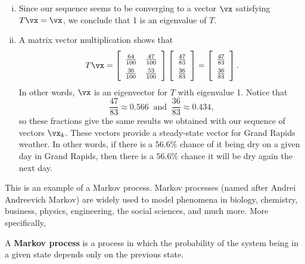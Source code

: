 \begin{example}
\begin{enumerate}[i.]
	\item Since our sequence seems to be converging to a vector $\vx$ satisfying $T \vx = \vx$, we conclude that 1 is an eigenvalue of $T$. 
	
	\item  A matrix vector multiplication shows that 
	\[T \vx = \left[ \renewcommand{\arraystretch}{1.4} \begin{array}{cc} \frac{64}{100}&\frac{47}{100} \\ \frac{36}{100}&\frac{53}{100} \end{array} \right]\left[ \renewcommand{\arraystretch}{1.4} \begin{array}{c} \frac{47}{83} \\ \frac{36}{83} \end{array} \right] = \left[ \renewcommand{\arraystretch}{1.4} \begin{array}{c} \frac{47}{83} \\ \frac{36}{83} \end{array} \right].\]
In other words, $\vx$ is an eigenvector for $T$ with eigenvalue 1. Notice that 
\[\frac{47}{83} \approx 0.566 \ \text{ and } \ \frac{36}{83} \approx 0.434,\]
so these fractions give the same results we obtained with our sequence of vectors $\vx_k$. These vectors provide a steady-state vector for Grand Rapids weather. In other words, if there is a $56.6\%$ chance of it being dry on a given day in Grand Rapids, then there is a $56.6\%$ chance it will be dry again the next day. 
	
	\end{enumerate}
	
\ea

This is an example of a Markov process. Markov processes (named after Andrei Andreevich Markov) are widely used to model phenomena in biology, chemistry, business, physics, engineering, the social sciences, and much more. More specifically, 

\begin{definition} \label{def:Markov}  A \textbf{Markov process} is a process in which the probability of the system being in a given state depends only on the previous state.
\end{definition}


\end{example}
